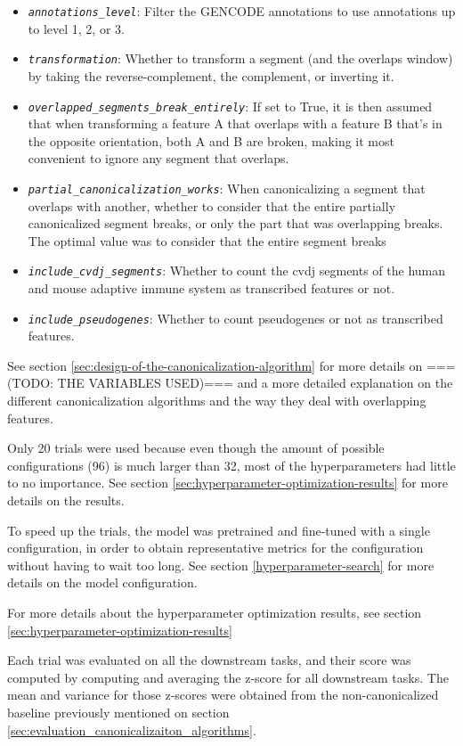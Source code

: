 \documentclass[   ]{article}
\let\oldtexttt\texttt
\renewcommand{\texttt}[1]{\oldtexttt{\itshape #1}}
\begin{document}
\begin{itemize}
	\item \texttt{annotations\_level}: Filter the GENCODE annotations to use
	annotations up to level 1, 2, or 3.
	\item \texttt{transformation}: Whether to transform a segment (and the
	overlaps window) by taking the reverse-complement, the complement, or
	inverting it.
	\item \texttt{overlapped\_segments\_break\_entirely}: If set to True, it is
	then assumed that when transforming a feature A that overlaps with a
	feature B that's in the opposite orientation, both A and B are broken, making
	it most convenient to ignore any segment that overlaps.
	\item \texttt{partial\_canonicalization\_works}: When canonicalizing a segment
	that overlaps with another, whether to consider that the entire
	partially canonicalized segment breaks, or only the part that was
	overlapping breaks. The optimal value was to consider that the entire
	segment breaks
	\item \texttt{include\_cvdj\_segments}: Whether to count the
	cvdj segments of the human and mouse adaptive immune system as
	transcribed features or not.
	\item \texttt{include\_pseudogenes}: Whether to count pseudogenes or not as
	transcribed features.
\end{itemize}

See section \ref{sec:design-of-the-canonicalization-algorithm} for more details on ===(TODO: THE VARIABLES USED)=== and a more detailed explanation on the different canonicalization algorithms and the way they deal with overlapping features.

Only 20 trials were used because even though the amount of possible configurations (96) is much larger than 32, most of the hyperparameters had little to no importance. See section \ref{sec:hyperparameter-optimization-results} for more details on the results.

To speed up the trials, the model was pretrained and fine-tuned with a
single configuration, in order to obtain representative metrics for the
configuration without having to wait too long. See section
\ref{hyperparameter-search} for more details on the model configuration.

For more details about the hyperparameter optimization results, see section \ref{sec:hyperparameter-optimization-results}

Each trial was evaluated on all the downstream tasks, and their score was computed by computing and averaging the z-score for all downstream tasks. The mean and variance for those z-scores were obtained from the non-canonicalized baseline previously mentioned on section \ref{sec:evaluation_canonicalizaiton_algorithms}. 
\end{document}
